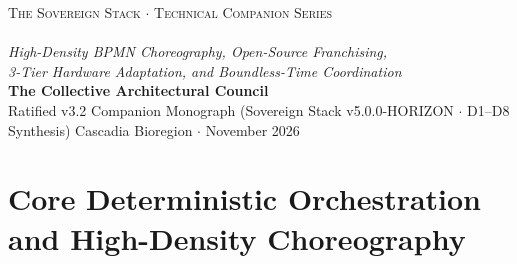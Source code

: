 \documentclass[11pt,a4paper]{book}
\DeclareRobustCommand{\_}{\ifmmode\text{\symbol{95}}\else\symbol{95}\allowbreak\fi}
\theoremstyle{plain}
\theoremstyle{definition}
\begin{document}
\frontmatter
\begin{titlepage}
    \thispagestyle{empty}
    \begin{center}
        \vspace*{3.2cm}
        {\Large \textsc{The Sovereign Stack $\cdot$ Technical Companion Series}} \\[1.2cm]
        {} \\[0.9cm]
        {\Large \textit{High-Density BPMN Choreography, Open-Source Franchising,}} \\[0.25cm]
        {\Large \textit{3-Tier Hardware Adaptation, and Boundless-Time Coordination}} \\[2.6cm]
        {\large \textbf{The Collective Architectural Council}} \\[0.4cm]
        {\normalsize Ratified v3.2 Companion Monograph (Sovereign Stack v5.0.0-HORIZON $\cdot$ D1--D8 Synthesis)}
        \vfill
        {\large Cascadia Bioregion $\cdot$ November 2026}
        \vspace*{2.2cm}
    \end{center}
    \clearpage
\end{titlepage}

\tableofcontents



\mainmatter

\part{Core Deterministic Orchestration and High-Density Choreography}










\end{document}
